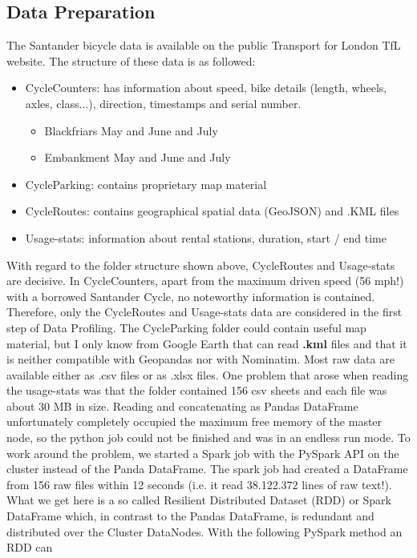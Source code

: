 \documentclass[12pt]{article}
\begin{document}
\subsection{Data Preparation}
The Santander bicycle data is available on the public Transport for London TfL website.
The structure of these data is as followed:
\begin{itemize}
\item CycleCounters: has information about speed, bike details (length, wheels, axles, class...),
direction, timestamps and serial number.
\begin{itemize}
\item Blackfriars May and June and July
\item Embankment May and June and July
\end{itemize}
\item CycleParking: contains proprietary map material
\item CycleRoutes: contains geographical spatial data (GeoJSON) and .KML files
\item Usage-stats: information about rental stations, duration, start / end time
\end{itemize}
With regard to the folder structure shown above, CycleRoutes and Usage-stats are decisive. In
\glqq CycleCounters\grqq, apart from the maximum driven speed (56 mph!) with a borrowed Santander Cycle, no noteworthy information is contained. Therefore, only the CycleRoutes and Usage-stats data are
considered in the first step of Data Profiling. The CycleParking folder could contain useful map material,
but I only know from Google Earth that can read \textbf{.kml} files and that it is neither compatible with Geopandas nor with Nominatim. Most raw data are available either as .csv files or as .xlsx files.
One problem that arose when reading the usage-stats was that the folder contained 156 csv sheets and
each file was about 30 MB in size. Reading and concatenating as Pandas DataFrame unfortunately
completely occupied the maximum free memory of the master node, so the python job could not be
finished and was in an endless run mode. To work around the problem, we started a Spark job with the
PySpark API on the cluster instead of the Panda DataFrame. The spark job had created a DataFrame from
156 raw files within 12 seconds (i.e. it read 38.122.372 lines of raw text!). What we get here is a so called
Resilient Distributed Dataset (RDD) or Spark DataFrame which, in contrast to the Pandas DataFrame, is
redundant and distributed over the Cluster DataNodes. With the following PySpark method an RDD can
\end{document}
